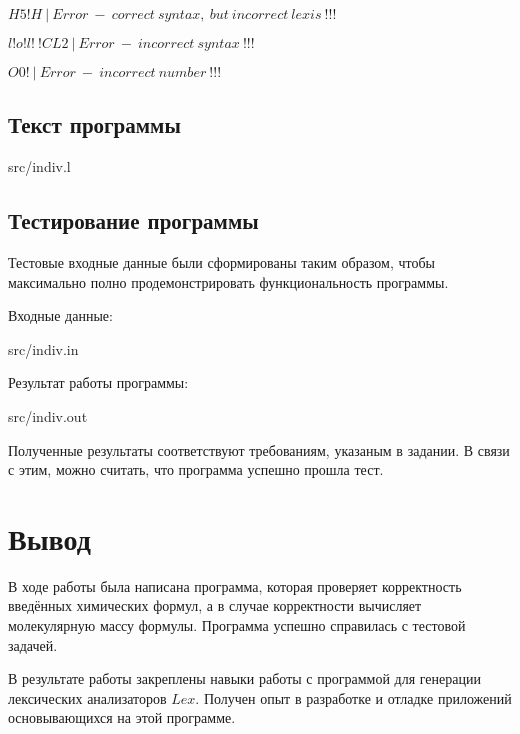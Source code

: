     $H5!H\ |\ Error\ -\ correct\ syntax,\ but\ incorrect\ lexis\ !!!$

    $l!o!l!\ !CL2\ |\ Error\ -\ incorrect\ syntax\ !!!$

    $O0!\ |\ Error\ -\ incorrect\ number\ !!!$

\subsection{Текст программы}

     {src/indiv.l}

\subsection{Тестирование программы}

    Тестовые входные данные были сформированы таким образом, чтобы максимально полно
    продемонстрировать функциональность программы.

    Входные данные:

     {src/indiv.in}

    Результат работы программы:

     {src/indiv.out}

    Полученные результаты соответствуют требованиям, указаным в задании.
    В связи с этим, можно считать, что программа успешно прошла тест.

\section{Вывод}

    В ходе работы была написана программа, которая проверяет корректность
    введённых химических формул, а в случае корректности вычисляет молекулярную массу формулы.
    Программа успешно справилась с тестовой задачей.

    В результате работы закреплены навыки работы с программой для генерации лексических анализаторов $Lex$.
    Получен опыт в разработке и отладке приложений основывающихся на этой программе.


